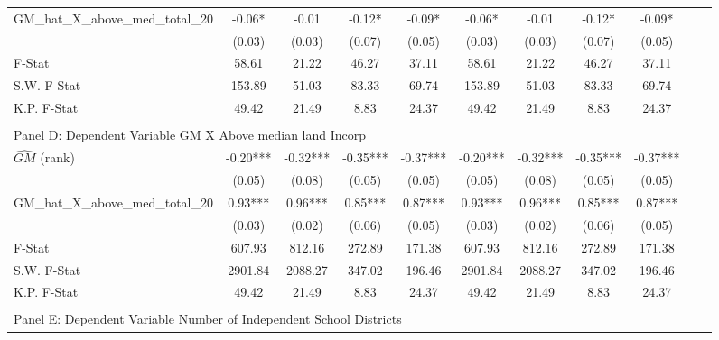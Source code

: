 \begin{table}[htbp]
\begin{threeparttable}
\begin{tabular}{l*{10}{c}}
\addlinespace
GM\_hat\_X\_above\_med\_total\_20&      -0.06*  &      -0.01   &      -0.12*  &      -0.09*  &      -0.06*  &      -0.01   &      -0.12*  &      -0.09*  \\
                &     (0.03)   &     (0.03)   &     (0.07)   &     (0.05)   &     (0.03)   &     (0.03)   &     (0.07)   &     (0.05)   \\
\midrule
F-Stat          &      58.61   &      21.22   &      46.27   &      37.11   &      58.61   &      21.22   &      46.27   &      37.11   \\
S.W. F-Stat     &     153.89   &      51.03   &      83.33   &      69.74   &     153.89   &      51.03   &      83.33   &      69.74   \\
K.P. F-Stat     &      49.42   &      21.49   &       8.83   &      24.37   &      49.42   &      21.49   &       8.83   &      24.37   \\
\cmidrule[\heavyrulewidth](lr){1-9} \\ \cmidrule[\heavyrulewidth](lr){1-9}
\multicolumn{8}{l}{Panel D: Dependent Variable GM X Above median land Incorp}\\
\cmidrule(lr){1-9}
$\hat{GM}$ (rank)&      -0.20***&      -0.32***&      -0.35***&      -0.37***&      -0.20***&      -0.32***&      -0.35***&      -0.37***\\
                &     (0.05)   &     (0.08)   &     (0.05)   &     (0.05)   &     (0.05)   &     (0.08)   &     (0.05)   &     (0.05)   \\
\addlinespace
GM\_hat\_X\_above\_med\_total\_20&       0.93***&       0.96***&       0.85***&       0.87***&       0.93***&       0.96***&       0.85***&       0.87***\\
                &     (0.03)   &     (0.02)   &     (0.06)   &     (0.05)   &     (0.03)   &     (0.02)   &     (0.06)   &     (0.05)   \\
\midrule
F-Stat          &     607.93   &     812.16   &     272.89   &     171.38   &     607.93   &     812.16   &     272.89   &     171.38   \\
S.W. F-Stat     &    2901.84   &    2088.27   &     347.02   &     196.46   &    2901.84   &    2088.27   &     347.02   &     196.46   \\
K.P. F-Stat     &      49.42   &      21.49   &       8.83   &      24.37   &      49.42   &      21.49   &       8.83   &      24.37   \\
\cmidrule[\heavyrulewidth](lr){1-9} \\ \cmidrule[\heavyrulewidth](lr){1-9}
\multicolumn{8}{l}{Panel E: Dependent Variable Number of Independent School Districts}\\

\end{tabular}
\end{threeparttable}
\end{table}
